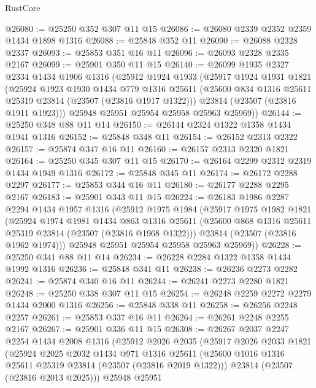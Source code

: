 \begin{lexlean}{RustCore}
\begin{coremodule}
@26080 := @25250 @352 @307 @11 @15
@26086 := @26080 @2339 @2352 @2359 @1434 @1898 @1316
@26088 := @25848 @352 @11
@26090 := @26088 @2328 @2337
@26093 := @25853 @351 @16 @11
@26096 := @26093 @2328 @2335 @2167
@26099 := @25901 @350 @11 @15
@26140 := @26099
    @1935
    @2327
    @2334
    @1434
    @1906
    @1316
    (@25912
      @1924
      @1933
      (@25917
        @1924
        @1931
        @1821
        (@25924
          @1923
          @1930
          @1434
          @779
          @1316
          @25611
          (@25600 @834 @1316 @25611 @25319 @23814 (@23507 (@23816 @1917 @1322)))
          @23814
          (@23507 (@23816 @1911 @1923)))
        @25948
        @25951
        @25954
        @25958
        @25963
        @25969))
@26144 := @25250 @348 @88 @11 @14
@26150 := @26144 @2324 @1322 @1358 @1434 @1941 @1316
@26152 := @25848 @348 @11
@26154 := @26152 @2313 @2322
@26157 := @25874 @347 @16 @11
@26160 := @26157 @2313 @2320 @1821
@26164 := @25250 @345 @307 @11 @15
@26170 := @26164 @2299 @2312 @2319 @1434 @1949 @1316
@26172 := @25848 @345 @11
@26174 := @26172 @2288 @2297
@26177 := @25853 @344 @16 @11
@26180 := @26177 @2288 @2295 @2167
@26183 := @25901 @343 @11 @15
@26224 := @26183
    @1986
    @2287
    @2294
    @1434
    @1957
    @1316
    (@25912
      @1975
      @1984
      (@25917
        @1975
        @1982
        @1821
        (@25924
          @1974
          @1981
          @1434
          @863
          @1316
          @25611
          (@25600 @868 @1316 @25611 @25319 @23814 (@23507 (@23816 @1968 @1322)))
          @23814
          (@23507 (@23816 @1962 @1974)))
        @25948
        @25951
        @25954
        @25958
        @25963
        @25969))
@26228 := @25250 @341 @88 @11 @14
@26234 := @26228 @2284 @1322 @1358 @1434 @1992 @1316
@26236 := @25848 @341 @11
@26238 := @26236 @2273 @2282
@26241 := @25874 @340 @16 @11
@26244 := @26241 @2273 @2280 @1821
@26248 := @25250 @338 @307 @11 @15
@26254 := @26248 @2259 @2272 @2279 @1434 @2000 @1316
@26256 := @25848 @338 @11
@26258 := @26256 @2248 @2257
@26261 := @25853 @337 @16 @11
@26264 := @26261 @2248 @2255 @2167
@26267 := @25901 @336 @11 @15
@26308 := @26267
    @2037
    @2247
    @2254
    @1434
    @2008
    @1316
    (@25912
      @2026
      @2035
      (@25917
        @2026
        @2033
        @1821
        (@25924
          @2025
          @2032
          @1434
          @971
          @1316
          @25611
          (@25600 @1016 @1316 @25611 @25319 @23814 (@23507 (@23816 @2019 @1322)))
          @23814
          (@23507 (@23816 @2013 @2025)))
        @25948
        @25951

\end{coremodule}
\end{lexlean}
